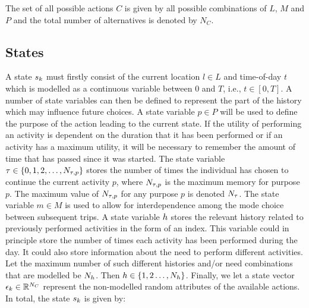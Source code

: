 The set of all possible actions $C$ is given by all possible combinations of $L$, $M$ and $P$ and the total number of alternatives is denoted by
$N_C$.
\subsection{States}
 A state $s_{k}$ must firstly consist of the current location $l \in L$ and time-of-day $t$ which is modelled as a continuous variable between 0 and $T$, i.e., $t\in [0,T]$. A number of state variables can then be defined to represent the part of the history which may influence future choices. 
A state variable $p \in P$ will be used to define the purpose of the action leading to the current state. If the utility of performing an activity is dependent on the duration that it has been performed or if an activity has a maximum utility, it will be necessary to remember the amount of time that has passed since it was started. The state variable $\tau \in \{0,1,2,\dots,N_{\tau,p} \}$ stores the number of times the individual has chosen to continue the current activity $p$, where $N_{\tau,p}$ is the maximum memory for purpose $p$. The maximum value of $N_{\tau,p}$ for any purpose $p$ is denoted $N_\tau$. The state variable $m \in M$ is used to allow for interdependence among the mode choice between subsequent trips. 
A state variable $h$ stores the relevant history related to previously performed activities in the form of an index. This variable could in principle store the number of times each activity has been performed during the day. It could also store information about the need to perform different activities. Let the maximum number of such different histories and/or need combinations that are modelled be $N_h$. Then $h\in\{1,2\dots,{N_h} \}$. Finally, we let a state vector $\epsilon_k \in \mathbb{R}^{N_C}$ represent the non-modelled random attributes of the available actions. In total, the state $s_{k}$ is given by:
